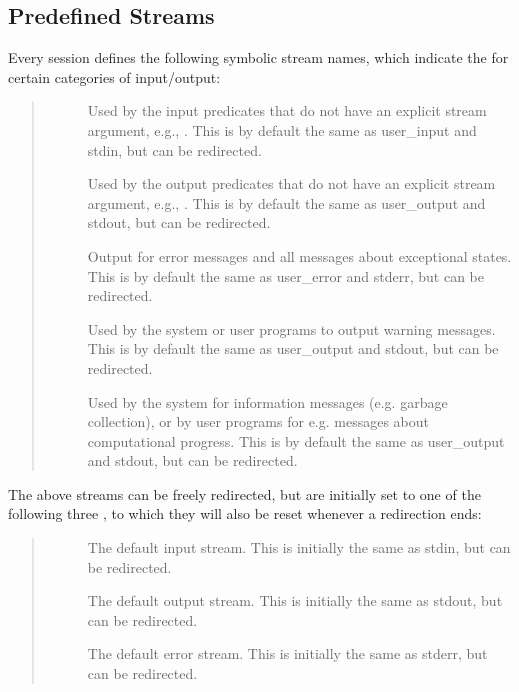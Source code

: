 \subsection{Predefined Streams}
\label{streams}
Every {\eclipse} session defines the following symbolic stream names, which
indicate the  for certain categories of input/output:
\begin{quote}
\begin{description}
\item[]
  Used by the input predicates that do not have an explicit stream argument,
  e.g., .
  This is by default the same as user_input and stdin, but can be redirected.
\item[]
  Used by the output predicates that do not have an explicit stream argument,
  e.g., .
  This is by default the same as user_output and stdout, but can be redirected.
\item[]
  Output for error messages and all messages about exceptional states.
  This is by default the same as user_error and stderr, but can be redirected.
\item[]
  Used by the system or user programs to output warning messages.
  This is by default the same as user_output and stdout, but can be redirected.
\item[]
  Used by the system for information messages (e.g. garbage collection),
  or by user programs for e.g. messages about computational progress.
  This is by default the same as user_output and stdout, but can be redirected.
\end{description}
\end{quote}

The above streams can be freely redirected, but are initially set to one
of the following three , to which they will
also be reset whenever a redirection ends:
\begin{quote}
\begin{description}
\item[]
  The default input stream.
  This is initially the same as stdin, but can be redirected.
\item[]
  The default output stream.
  This is initially the same as stdout, but can be redirected.
\item[]
  The default error stream.
  This is initially the same as stderr, but can be redirected.
\end{description}
\end{quote}

